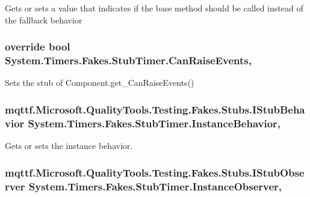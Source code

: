Gets or sets a value that indicates if the base method should be called instead of the fallback behavior

\hypertarget{class_system_1_1_timers_1_1_fakes_1_1_stub_timer_ab6de0bcb7d73796563dbaa3499985e84}{
\subsubsection[{Can\-Raise\-Events}]{\setlength{\rightskip}{0pt plus 5cm}override bool System.\-Timers.\-Fakes.\-Stub\-Timer.\-Can\-Raise\-Events\hspace{0.3cm}{\ttfamily [get]}, {\ttfamily [protected]}}}\label{class_system_1_1_timers_1_1_fakes_1_1_stub_timer_ab6de0bcb7d73796563dbaa3499985e84}


Sets the stub of Component.\-get\-\_\-\-Can\-Raise\-Events()

\hypertarget{class_system_1_1_timers_1_1_fakes_1_1_stub_timer_aa0280bfddcd69f02ad83ce9e94caa520}{
\subsubsection[{Instance\-Behavior}]{\setlength{\rightskip}{0pt plus 5cm}mqttf.\-Microsoft.\-Quality\-Tools.\-Testing.\-Fakes.\-Stubs.\-I\-Stub\-Behavior System.\-Timers.\-Fakes.\-Stub\-Timer.\-Instance\-Behavior\hspace{0.3cm}{\ttfamily [get]}, {\ttfamily [set]}}}\label{class_system_1_1_timers_1_1_fakes_1_1_stub_timer_aa0280bfddcd69f02ad83ce9e94caa520}


Gets or sets the instance behavior.

\hypertarget{class_system_1_1_timers_1_1_fakes_1_1_stub_timer_a1ed0b66c8c450396b1cceabea3e0fb84}{
\subsubsection[{Instance\-Observer}]{\setlength{\rightskip}{0pt plus 5cm}mqttf.\-Microsoft.\-Quality\-Tools.\-Testing.\-Fakes.\-Stubs.\-I\-Stub\-Observer System.\-Timers.\-Fakes.\-Stub\-Timer.\-Instance\-Observer\hspace{0.3cm}{\ttfamily [get]}, {\ttfamily [set]}}}\label{class_system_1_1_timers_1_1_fakes_1_1_stub_timer_a1ed0b66c8c450396b1cceabea3e0fb84}


